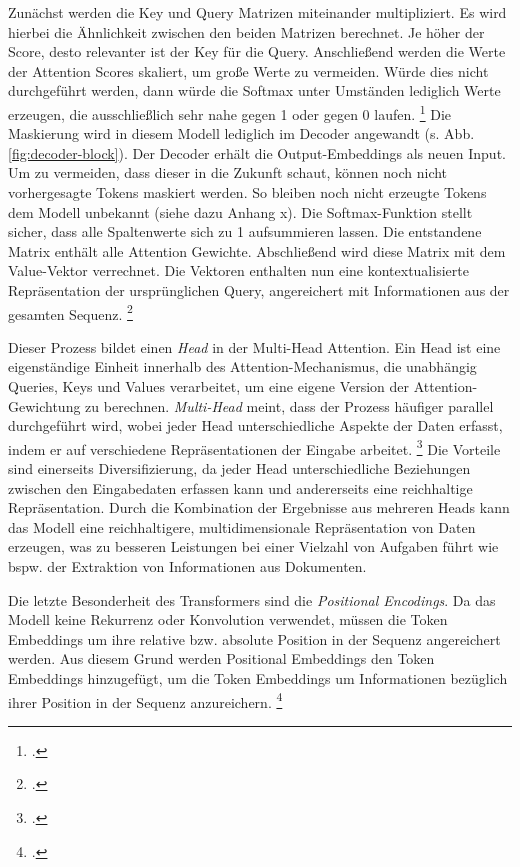 Zunächst werden die Key und Query Matrizen miteinander multipliziert. Es wird hierbei die Ähnlichkeit zwischen den beiden Matrizen berechnet. Je höher der Score, desto relevanter ist der Key für die Query. Anschließend werden die Werte der Attention Scores skaliert, um große Werte zu vermeiden. Würde dies nicht durchgeführt werden, dann würde die Softmax %
unter Umständen lediglich Werte erzeugen, die ausschließlich sehr nahe gegen 1 oder gegen 0 laufen. \footcites[Vgl. dazu ausführlich][S. 4]{vaswani_attention_2017} Die Maskierung wird in diesem Modell lediglich im Decoder angewandt (s. Abb. \ref{fig:decoder-block}). Der Decoder erhält die Output-Embeddings als neuen Input. Um zu vermeiden, dass dieser in die Zukunft schaut, können noch nicht vorhergesagte Tokens maskiert werden. So bleiben noch nicht erzeugte Tokens dem Modell unbekannt (siehe dazu Anhang x). Die Softmax-Funktion stellt sicher, dass alle Spaltenwerte sich zu 1 aufsummieren lassen. Die entstandene Matrix enthält alle Attention Gewichte. Abschließend wird diese Matrix mit dem Value-Vektor verrechnet. Die Vektoren enthalten nun eine kontextualisierte Repräsentation der ursprünglichen Query, angereichert mit Informationen aus der gesamten Sequenz. \footcites[Vgl.][S. 62 f.]{tunstall_natural_2022}

Dieser Prozess bildet einen \emph{Head} in der Multi-Head Attention. Ein Head ist eine eigenständige Einheit innerhalb des Attention-Mechanismus, die unabhängig Queries, Keys und Values verarbeitet, um eine eigene Version der Attention-Gewichtung zu berechnen. \emph{Multi-Head} meint, dass der Prozess häufiger parallel durchgeführt wird, wobei jeder Head unterschiedliche Aspekte der Daten erfasst, indem er auf verschiedene Repräsentationen der Eingabe arbeitet. \footcites[Vgl.][S. 4 f.]{vaswani_attention_2017} Die Vorteile sind einerseits Diversifizierung, da jeder Head unterschiedliche Beziehungen zwischen den Eingabedaten erfassen kann und andererseits eine reichhaltige Repräsentation. Durch die Kombination der Ergebnisse aus mehreren Heads kann das Modell eine reichhaltigere, multidimensionale Repräsentation von Daten erzeugen, was zu besseren Leistungen bei einer Vielzahl von Aufgaben führt wie bspw. der Extraktion von Informationen aus Dokumenten.

Die letzte Besonderheit des Transformers sind die \emph{Positional Encodings}. Da das Modell keine Rekurrenz oder Konvolution verwendet, müssen die Token Embeddings um ihre relative bzw. absolute Position in der Sequenz angereichert werden. Aus diesem Grund werden Positional Embeddings den Token Embeddings hinzugefügt, um die Token Embeddings um Informationen bezüglich ihrer Position in der Sequenz anzureichern. \footcites[Vgl.][S. 6]{vaswani_attention_2017}

